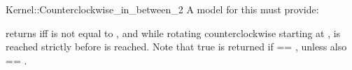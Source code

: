 
\begin{ccRefFunctionObjectConcept}{Kernel::Counterclockwise_in_between_2}
A model for this must provide:


{returns  iff  is not equal to , and 
        while rotating counterclockwise starting at , 
         is reached strictly before  is reached.
        Note that true is returned if  == , unless
        also  == .}

\end{ccRefFunctionObjectConcept}
